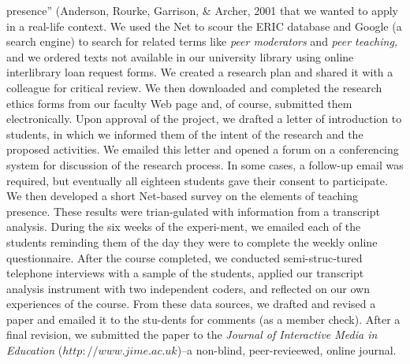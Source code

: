 \documentclass{book}
\begin{document}
\vspace*{0.5cm}
presence'' (Anderson, Rourke, Garrison, \& Archer, 2001 that we wanted to apply in a real-life context. We used the Net to scour the ERIC database and Google  (a search engine) to search for related terms like \emph{peer moderators} and \emph{peer teaching,} and we ordered texts not available in our university library using online interlibrary loan request forms. We created a research plan and shared it with a colleague for critical review. We then downloaded  and completed the research ethics forms from our faculty Web page and, of course, submitted them electronically. Upon approval of the project, we drafted a letter of introduction to students, in which we informed them of the intent of the research and the proposed activities. We emailed this letter and opened a forum on a conferencing system for discussion of the research process. In some cases, a follow-up email was required, but eventually all eighteen students gave their consent to participate. We then developed a short Net-based survey on the elements of teaching presence. These results were trian-gulated with information from a transcript analysis. During the six weeks of the experi-ment, we emailed each of the students reminding them of the day they were to complete the weekly online questionnaire. After the course completed, we conducted semi-struc-tured telephone interviews with a sample of the students, applied our transcript analysis instrument with two independent coders, and reflected on our own experiences of the course. From these data sources, we drafted and revised a paper and emailed it to the stu-dents for comments (as a member check). After a final revision, we submitted the paper to the \emph{Journal of Interactive Media in Education} ($http://www.jime.ac.uk$)--a non-blind, peer-revieewed, online journal.
\end{document}
